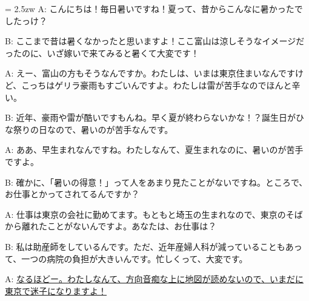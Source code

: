 \documentclass[11pt]{amsart}
\title{}
\author{}
\newenvironment{hangall}[1]{\hangindent = 2.5zw\everypar{\hangindent = 2.5zw}}{}
\begin{document}
\maketitle
\begin{hangall}{}%
A: こんにちは！毎日暑いですね！夏って、昔からこんなに暑かったでしたっけ？

B: ここまで昔は暑くなかったと思いますよ！ここ富山は涼しそうなイメージだったのに、いざ嫁いで来てみると暑くて大変です！

A: えー、富山の方もそうなんですか。わたしは、いまは東京住まいなんですけど、こっちはゲリラ豪雨もすごいんですよ。わたしは雷が苦手なのでほんと辛い。

B: 近年、豪雨や雷が酷いですもんね。早く夏が終わらないかな！？誕生日がひな祭りの日なので、暑いのが苦手なんです。

A: ああ、早生まれなんですね。わたしなんて、夏生まれなのに、暑いのが苦手ですよ。

B: 確かに、「暑いの得意！」って人をあまり見たことがないですね。ところで、お仕事とかってされてるんですか？

A: 仕事は東京の会社に勤めてます。もともと埼玉の生まれなので、東京のそばから離れたことがないんですよ。あなたは、お仕事は？

B: 私は助産師をしているんです。ただ、近年産婦人科が減っていることもあって、一つの病院の負担が大きいんです。忙しくって、大変です。

A: \ul{なるほどー。わたしなんて、方向音痴な上に地図が読めないので、いまだに東京で迷子になりますよ！}\end{hangall}
\end{document}
